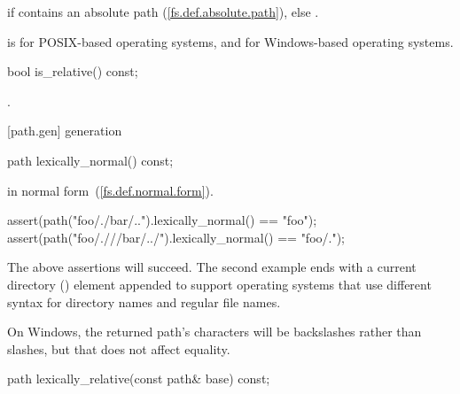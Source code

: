 \begin{itemdescr}
\pnum
\returns {} if 
  contains an absolute path (\ref{fs.def.absolute.path}), else .

\pnum
\begin{example}  is
       for  POSIX-based operating systems, and  for Windows-based
operating systems. \end{example}
\end{itemdescr}

%
\begin{itemdecl}
bool is_relative() const;
\end{itemdecl}

\begin{itemdescr}
\pnum
\returns {}.
\end{itemdescr}

[path.gen]{ generation}

%
\begin{itemdecl}
path lexically_normal() const;
\end{itemdecl}

\begin{itemdescr}
\pnum
\returns {} in normal form~(\ref{fs.def.normal.form}).

\begin{example}
\begin{codeblock}
assert(path("foo/./bar/..").lexically_normal() == "foo");
assert(path("foo/.///bar/../").lexically_normal() == "foo/.");
\end{codeblock}
The above assertions will succeed.
The second example ends with a current directory () element
appended to support operating systems
that use different syntax for directory names and regular file names.

On Windows, the returned path's  characters
will be backslashes rather than slashes,
but that does not affect  equality.
\end{example}
\end{itemdescr}

%
\begin{itemdecl}
path lexically_relative(const path& base) const;
\end{itemdecl}

